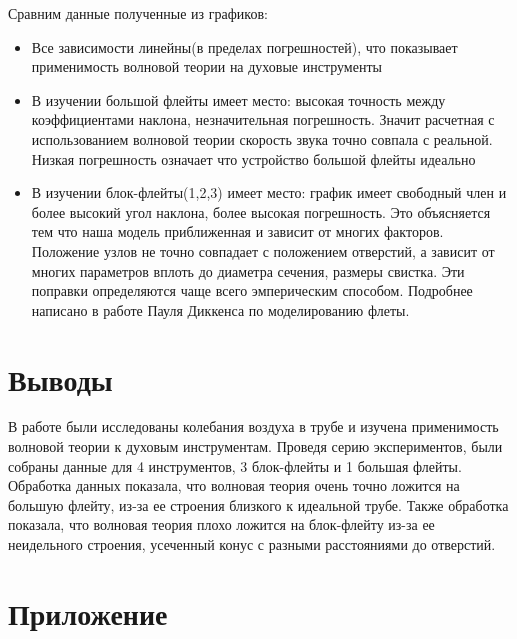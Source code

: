 Сравним данные полученные из графиков:
\begin{itemize}
    \item Все зависимости линейны(в пределах погрешностей), что показывает применимость волновой теории на духовые инструменты
    \item В изучении большой флейты имеет место: высокая точность между коэффициентами наклона, незначительная погрешность. Значит расчетная с использованием волновой теории скорость звука точно совпала с реальной. Низкая погрешность означает что устройство большой флейты идеально
    \item В изучении блок-флейты(1,2,3) имеет место: график имеет свободный член и более высокий угол наклона, более высокая погрешность. Это объясняется тем что наша модель приближенная и зависит от многих факторов. Положение узлов не точно совпадает с положением отверстий, а зависит от многих параметров вплоть до диаметра сечения, размеры свистка. Эти поправки определяются чаще всего эмперическим способом. Подробнее написано в работе Пауля Диккенса по моделированию флеты.
\end{itemize}

\newpage
\section{Выводы}
В работе были исследованы колебания воздуха в трубе и изучена применимость волновой теории к духовым инструментам. Проведя серию экспериментов, были собраны данные для 4 инструментов, 3 блок-флейты и 1 большая флейты.
Обработка данных показала, что волновая теория очень точно ложится на большую флейту, из-за ее строения близкого к идеальной трубе. Также обработка показала, что волновая теория плохо ложится на блок-флейту из-за ее неидельного строения, усеченный конус с разными расстояниями до отверстий.

\newpage
\section{Приложение}
